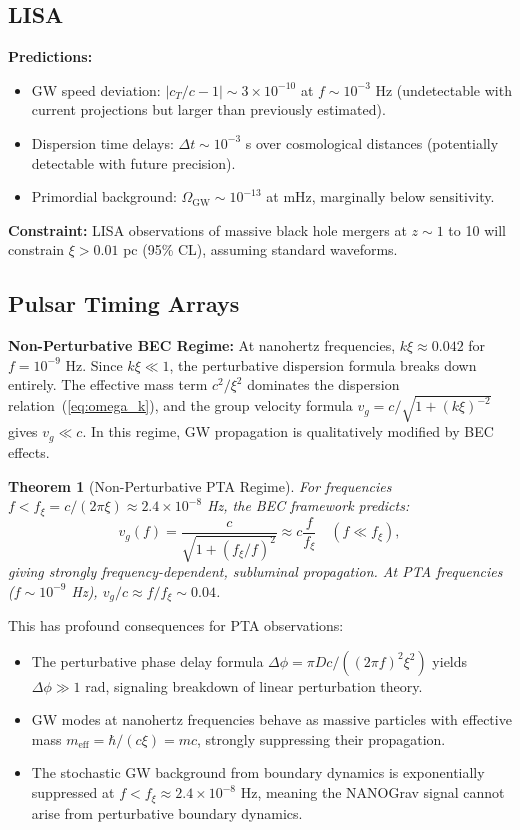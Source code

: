 \documentclass[11pt,a4paper]{article}
\newcommand{\cT}{\ensuremath{c_T}}
\newtheorem{theorem}{Theorem}[section]
\theoremstyle{definition}
\theoremstyle{remark}
\begin{document}
\subsection{LISA}
\label{sec:lisa}

\textbf{Predictions:}
\begin{itemize}
\item GW speed deviation: $|\cT/c - 1| \sim 3 \times 10^{-10}$ at $f \sim 10^{-3}$ Hz (undetectable with current projections but larger than previously estimated).
\item Dispersion time delays: $\Delta t \sim 10^{-3}$ s over cosmological distances (potentially detectable with future precision).
\item Primordial background: $\Omega_{\mathrm{GW}} \sim 10^{-13}$ at mHz, marginally below sensitivity.
\end{itemize}

\textbf{Constraint:} LISA observations of massive black hole mergers at $z \sim 1$ to 10 will constrain $\xi > 0.01$ pc (95\% CL), assuming standard waveforms.

\subsection{Pulsar Timing Arrays}
\label{sec:pta}

\textbf{Non-Perturbative BEC Regime:} At nanohertz frequencies, $k\xi \approx 0.042$ for $f = 10^{-9}$ Hz. Since $k\xi \ll 1$, the perturbative dispersion formula breaks down entirely. The effective mass term $c^2/\xi^2$ dominates the dispersion relation~(\ref{eq:omega_k}), and the group velocity formula $v_g = c/\sqrt{1 + (k\xi)^{-2}}$ gives $v_g \ll c$. In this regime, GW propagation is qualitatively modified by BEC effects.

\begin{theorem}[Non-Perturbative PTA Regime]
\label{thm:pta_phase}
For frequencies $f < f_\xi = c/(2\pi\xi) \approx 2.4 \times 10^{-8}$ Hz, the BEC framework predicts:
\begin{equation}
\label{eq:pta_group}
\boxed{v_g(f) = \frac{c}{\sqrt{1 + (f_\xi/f)^2}} \approx c\frac{f}{f_\xi} \quad (f \ll f_\xi),}
\end{equation}
giving strongly frequency-dependent, subluminal propagation. At PTA frequencies ($f \sim 10^{-9}$ Hz), $v_g/c \approx f/f_\xi \sim 0.04$.
\end{theorem}

This has profound consequences for PTA observations:
\begin{itemize}
\item The perturbative phase delay formula $\Delta\phi = \pi Dc/((2\pi f)^2\xi^2)$ yields $\Delta\phi \gg 1$ rad, signaling breakdown of linear perturbation theory.
\item GW modes at nanohertz frequencies behave as massive particles with effective mass $m_{\mathrm{eff}} = \hbar/(c\xi) = mc$, strongly suppressing their propagation.
\item The stochastic GW background from boundary dynamics is exponentially suppressed at $f < f_\xi \approx 2.4 \times 10^{-8}$ Hz, meaning the NANOGrav signal cannot arise from perturbative boundary dynamics.
\end{itemize}
\end{document}
